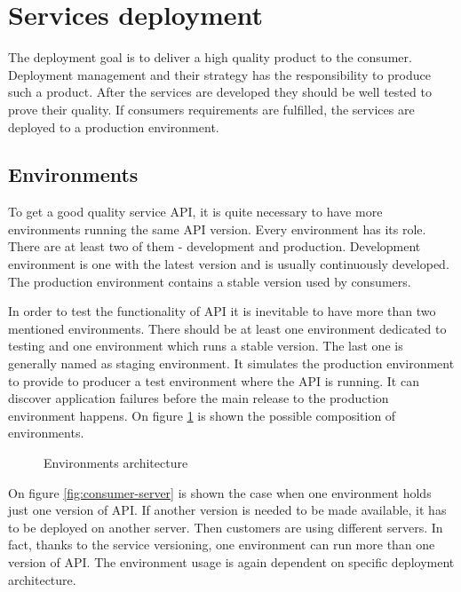 \section{Services deployment}
The deployment goal is to deliver a high quality product to the consumer. Deployment management and their strategy has the responsibility to produce such a product. After the services are developed they should be well tested to prove their quality. If consumers requirements are fulfilled, the services are deployed to a production environment.

\subsection{Environments}
To get a good quality service API, it is quite necessary to have more environments running the same API version. Every environment has its role. There are at least two of them - development and production. Development environment is one with the latest version and is usually continuously developed. The production environment contains a stable version used by consumers.

In order to test the functionality of API it is inevitable to have more than two mentioned environments. There should be at least one environment dedicated to testing and one environment which runs a stable version. The last one is generally named as staging environment. It simulates the production environment to provide to producer a test environment where the API is running. It can discover application failures before the main release to the production environment happens. On figure \ref{fig:environments} is shown the possible composition of environments.

\begin{figure}[htp] 
\caption{Environments architecture}
\label{fig:environments}
\end{figure} 


On figure \ref{fig:consumer-server} is shown the case when one environment holds just one version of API. If another version is needed to be made available, it has to be deployed on another server. Then customers are using different servers. In fact, thanks to the service versioning, one environment can run more than one version of API. The environment usage is again dependent on specific deployment architecture.

